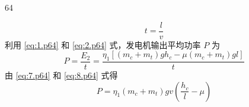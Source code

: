 \begin{solution}{64}
\begin{subsolution}
\begin{equation}
            t = \frac{l}{v}
            \label{eq:7.p64}
        \end{equation}
        利用 \eqref{eq:1.p64} 和 \eqref{eq:2.p64} 式，发电机输出平均功率 $P$ 为
        \begin{equation}
            P = \frac{E_{2}}{t} = \frac{\eta_{1} \left[ (m_{c} + m_{t}) g h_{c} - \mu (m_{c} + m_{t}) g l \right]}{t}
            \label{eq:8.p64}
        \end{equation}
        由 \eqref{eq:7.p64} 和 \eqref{eq:8.p64} 式得
        \begin{equation}
            P = \eta_{1} (m_{c} + m_{t}) g v \left( \frac{h_{c}}{l} - \mu \right)
            \label{eq:9.p64}
        \end{equation}
    \end{subsolution}
\end{solution}